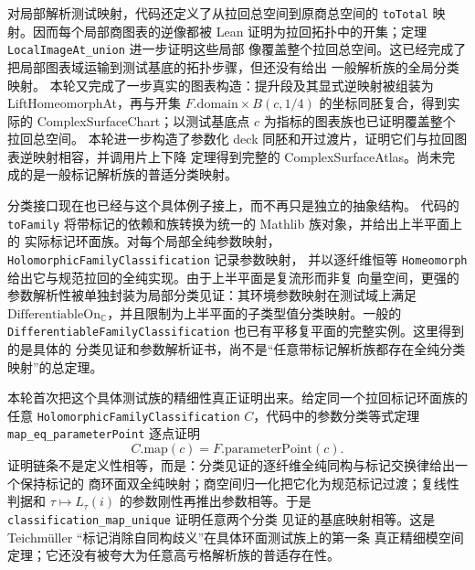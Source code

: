 \documentclass[UTF8,fontset=none,a4paper,11pt]{ctexart}
\begin{document}
对局部解析测试映射，代码还定义了从拉回总空间到原商总空间的
\texttt{toTotal} 映射。因而每个局部商图表的逆像都被 Lean 证明为拉回拓扑中的开集；定理
\texttt{LocalImageAt\_union} 进一步证明这些局部
像覆盖整个拉回总空间。这已经完成了把局部图表域运输到测试基底的拓扑步骤，但还没有给出
一般解析族的全局分类映射。
本轮又完成了一步真实的图表构造：提升段及其显式逆映射被组装为
LiftHomeomorphAt，再与开集
\(F.\mathrm{domain}\times B(c,1/4)\) 的坐标同胚复合，得到实际的
ComplexSurfaceChart；以测试基底点 \(c\) 为指标的图表族也已证明覆盖整个拉回总空间。
本轮进一步构造了参数化 deck 同胚和开过渡片，证明它们与拉回图表逆映射相容，并调用片上下降
定理得到完整的 ComplexSurfaceAtlas。尚未完成的是一般标记解析族的普适分类映射。

分类接口现在也已经与这个具体例子接上，而不再只是独立的抽象结构。
代码的 \texttt{toFamily} 将带标记的依赖和族转换为统一的 Mathlib 族对象，并给出上半平面上的
实际标记环面族。对每个局部全纯参数映射，\texttt{HolomorphicFamilyClassification} 记录参数映射，
并以逐纤维恒等 \texttt{Homeomorph} 给出它与规范拉回的全纯实现。由于上半平面是复流形而非复
向量空间，更强的参数解析性被单独封装为局部分类见证：其环境参数映射在测试域上满足
\(\mathrm{DifferentiableOn}_{\mathbb C}\)，并且限制为上半平面的子类型值分类映射。一般的
\texttt{DifferentiableFamilyClassification} 也已有平移复平面的完整实例。这里得到的是具体的
分类见证和参数解析证书，尚不是“任意带标记解析族都存在全纯分类映射”的总定理。

本轮首次把这个具体测试族的精细性真正证明出来。给定同一个拉回标记环面族的任意
\texttt{HolomorphicFamilyClassification} \(C\)，代码中的参数分类等式定理
\texttt{map\_eq\_parameterPoint}
逐点证明
\[
 C.\mathrm{map}(c)=F.\mathrm{parameterPoint}(c).
\]
证明链条不是定义性相等，而是：分类见证的逐纤维全纯同构与标记交换律给出一个保持标记的
商环面双全纯映射；商空间归一化把它化为规范标记过渡；复线性判据和
\(\tau\mapsto L_\tau(i)\) 的参数刚性再推出参数相等。于是
\texttt{classification\_map\_unique} 证明任意两个分类
见证的基底映射相等。这是 Teichmüller “标记消除自同构歧义”在具体环面测试族上的第一条
真正精细模空间定理；它还没有被夸大为任意高亏格解析族的普适存在性。
\end{document}

